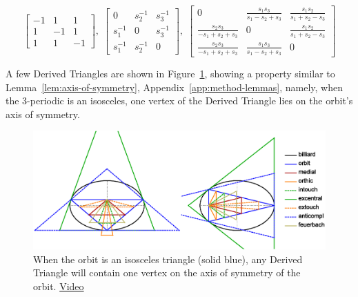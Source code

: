 

\begin{equation*}
\left[
\begin{matrix}
-1&1&1\\1&-1&1\\1&1&-1
\end{matrix}
\right],\;
\left[
\begin{matrix}
0&s_2^{-1}&s_3^{-1}\\s_1^{-1}&0&s_3^{-1}\\s_1^{-1}&s_2^{-1}&0
\end{matrix}
\right],\;
\left[
\begin{matrix}
0&\frac{s_1 s_3}{s_1-s_2+s_3}&\frac{s_1 s_2}{s_1+s_2-s_3}\\
\frac{s_2 s_3}{-s_1+s_2+s_3}&0&\frac{s_1 s_2}{s_1+s_2-s_3}\\
\frac{s_2 s_3}{-s_1+s_2+s_3}&\frac{s_1 s_3}{s_1-s_2+s_3}&0
\end{matrix}
\right]
\end{equation*}

A few Derived Triangles are shown in Figure~\ref{fig:derived-isosceles}, showing a property similar to Lemma~\ref{lem:axis-of-symmetry}, Appendix~\ref{app:method-lemmas}, namely, when the 3-periodic is an isosceles, one vertex of the Derived Triangle lies on the orbit's axis of symmetry.

\begin{figure}[H]
    \centering
    \includegraphics[width=\textwidth]{pics_1070_lemma3}
    \caption{When the orbit is an isosceles triangle (solid blue), any Derived Triangle will contain one vertex on the axis of symmetry of the orbit. \href{https://youtu.be/xyroRTEVNDc}{Video}}
    \label{fig:derived-isosceles}
\end{figure}



